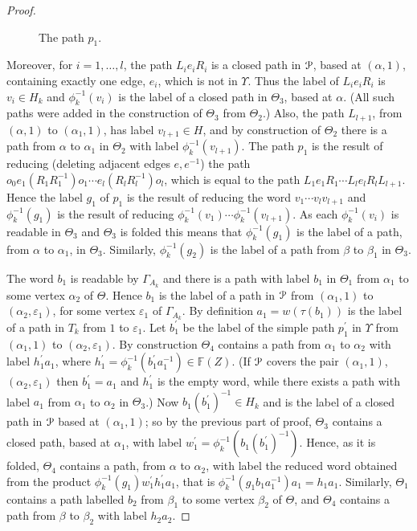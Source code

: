 \documentclass[a4paper,12pt]{article}
\renewcommand{\a}{\alpha }
\renewcommand{\b}{\beta }
\newcommand{\G}{\Gamma }
\newcommand{\e}{\varepsilon }
\newcommand{\T}{\Theta }
\renewcommand{\t}{\tau }
\newcommand{\U}{\Upsilon }
\newcommand{\cP}{{\cal{P}}}
\numberwithin{equation}{section}
\numberwithin{figure}{section}
\newcommand{\FF}{\ensuremath{\mathbb{F}}}
\begin{document}
\begin{proof}
\begin{figure}
\begin{center}
\end{center}
\caption{The path $p_1$.}
\label{fig:LeR}
\end{figure}
Moreover, for $i=1,\ldots ,l$,
the path $L_i e_i R_i$ is a closed path in $\cP$, based
at $(\a,1)$, containing exactly one edge, $e_i$, which is not in $\U$.
Thus the label of  $L_i e_i R_i$ is $v_i\in H_k$ and $\phi_k^{-1}(v_i)$ is the
label of a closed path in $\T_3$, based at  $\a$. (All such paths
were added in the construction of $\T_3$ from $\T_2$.)
Also, the path $L_{l+1}$, from $(\a,1)$ to $(\a_1,1)$, has
label $v_{l+1}\in H$,
and by construction of $\T_2$ there is a path from $\a$ to
$\a_1$ in $\T_2$ with label $\phi_k^{-1}(v_{l+1})$.
The path
$p_1$ is the result of reducing (deleting adjacent edges $e,e^{-1}$) the path
$o_0 e_1 (R_1 R_1^{-1}) o_1 \cdots e_{l}(R_l R_l^{-1}) o_{l}$, which
is equal to the path $L_1 e_1 R_1 \cdots L_l e_l R_l L_{l+1}$. Hence the label $g_1$
of $p_1$ is the result of
reducing the word $v_1\cdots v_l v_{l+1}$
 and $\phi_k^{-1}(g_1)$ is the result of
reducing $\phi_k^{-1}(v_1) \cdots \phi_k^{-1}(v_{l+1})$. As each $\phi_k^{-1}(v_i)$ is readable
in $\T_3$ and $\T_3$ is folded this means  that $\phi_k^{-1}(g_1)$ is the
label of a path, from $\a$ to   $\a_1$, in $\T_3$. Similarly,
$\phi_k^{-1}(g_2)$
is the label of a path from $\b$ to $\b_1$ in $\T_3$.

The word $b_1$ is readable by $\G_{A_k}$ and there
is a path with label $b_1$ in $\T_1$ from $\a_1$ to some vertex $\a_2$
of $\T$.
Hence $b_1$ is the label of a path in $\cP$ from $(\a_1,1)$ to
$(\a_2,\e_1)$, for some vertex $\e_1$ of $\G_{A_k}$.
By definition $a_1=w(\t(b_1))$ is the label of a path in $T_k$ from $1$ to $\e_1$.
Let $b_1^\prime$
 be the label of the simple path $p_1^\prime$ in $\U$ from
$(\a_1,1)$ to $(\a_2,\e_1)$. By construction $\T_4$ contains a path
from $\a_1$ to $\a_2$ with label $h_1^\prime a_1$, where
$h_1^\prime =\phi_k^{-1}(b_1^\prime a_1^{-1})\in \FF(Z)$.
(If $\cP$ covers the pair $(\a_1,1)$, $(\a_2,\e_1)$ then
$b_1^\prime=a_1$ and $h_1^\prime$ is the empty word, while there
exists a path with label $a_1$ from $\a_1$ to $\a_2$ in $\T_3$.)
Now $b_1(b_1^\prime)^{-1}\in H_k$ and is the label of a closed
path  in $\cP$ based at $(\a_1,1)$; so by the
previous part of proof, $\T_3$ contains a closed path, based at $\a_1$,
 with label
$w_1^\prime=\phi_k^{-1}(b_1(b_1^\prime)^{-1})$. Hence, as it is folded,
$\T_4$ contains a path, from $\a$ to $\a_2$,
with label the reduced word obtained from the product
$\phi_k^{-1}(g_1)w_1^{\prime} h_1^\prime a_1$, that is
 $\phi_k^{-1}(g_1b_1a_1^{-1}) a_1=h_1a_1$.
 Similarly, $\T_1$ contains a path labelled $b_2$ from $\b_1$ to
some vertex $\b_2$ of $\T$, and $\T_4$ contains a path from
$\b$ to $\b_2$ with label $h_2a_2$.


\end{proof}
\end{document}
